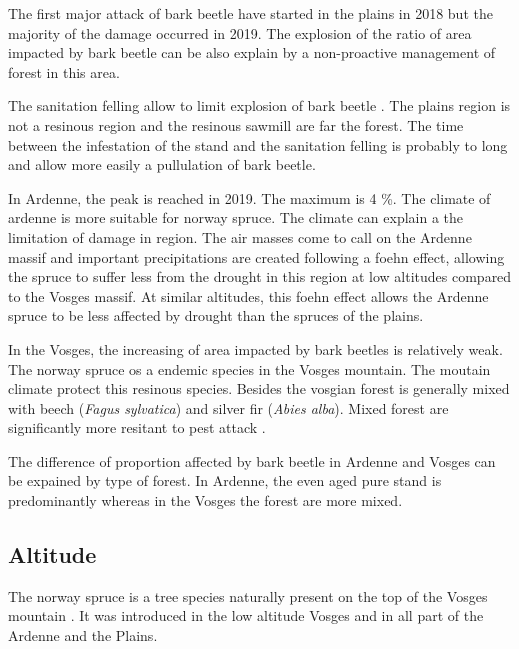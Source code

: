 \documentclass[3p,procedia]{elsarticle}
\begin{document}
The first major attack of bark beetle have started in the plains in 2018 but the majority of the damage occurred in 2019. 
The explosion of the ratio of area impacted by bark beetle can be also explain by a non-proactive management of forest in this area.

The sanitation felling allow to limit explosion of bark beetle \citep{stadelmann_effects_2013}.
The plains region is not a resinous region and the resinous sawmill are far the forest. 
The time between the infestation of the stand and the sanitation felling is probably to long and allow more easily a pullulation of bark beetle.

In Ardenne, the peak is reached in 2019. The maximum is 4 \%. The climate of ardenne is more suitable for norway spruce. 
The climate can explain a the limitation of damage in region. 
The air masses come to call on the Ardenne massif and important precipitations are created following a foehn effect, allowing the spruce to suffer less from the drought in this region at low altitudes compared to the Vosges massif. 
At similar altitudes, this foehn effect allows the Ardenne spruce to be less affected by drought than the spruces of the plains.

In the Vosges, the increasing of area impacted by bark beetles is relatively weak.
The norway spruce os a endemic species in the Vosges mountain. 
The moutain climate protect this resinous species. 
Besides the vosgian forest is generally mixed with beech (\textit{Fagus sylvatica}) and  silver fir (\textit{Abies alba}). Mixed forest are significantly more resitant to pest attack \citep{jactel_2021}. 

The difference of proportion affected by bark beetle in Ardenne and Vosges can be expained by type of forest.
In Ardenne, the even aged pure stand is predominantly whereas in the Vosges  the forest are more mixed. 

\subsection{Altitude}


The norway spruce is a tree species naturally present on the top of the Vosges mountain \citep{guinier_trois_1959}. 
It was introduced in the low altitude Vosges and in  all part of the Ardenne and the Plains. 
\end{document}
